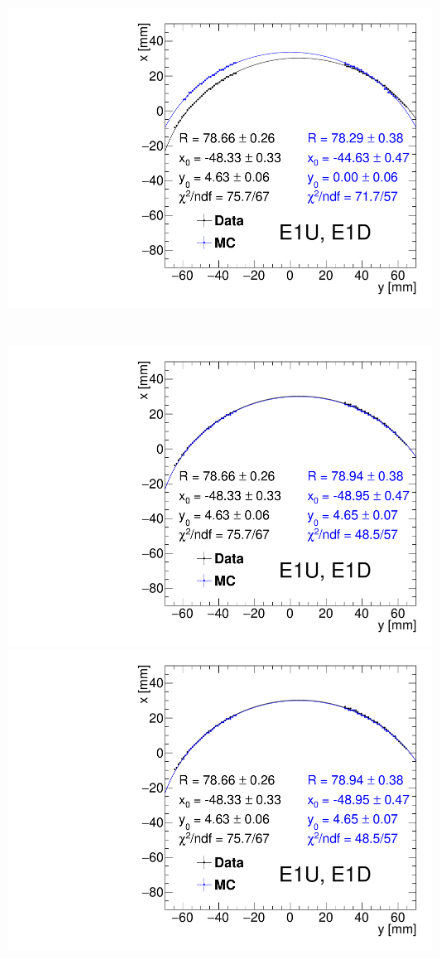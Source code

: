 \begin{figure}[hb]
{  \includegraphics[width=\linewidth,page=4]{graphics/rpSim/Apertures_swapedAxes_withFit_beforeDxShift.pdf}
}~
\parbox{0.495\textwidth}{
  \centering
  \includegraphics[width=\linewidth,page=2]{graphics/rpSim/Apertures_swapedAxes_withFit.pdf}\\
  \includegraphics[width=\linewidth,page=3]{graphics/rpSim/Apertures_swapedAxes_withFit.pdf}\\
}
\end{figure}
